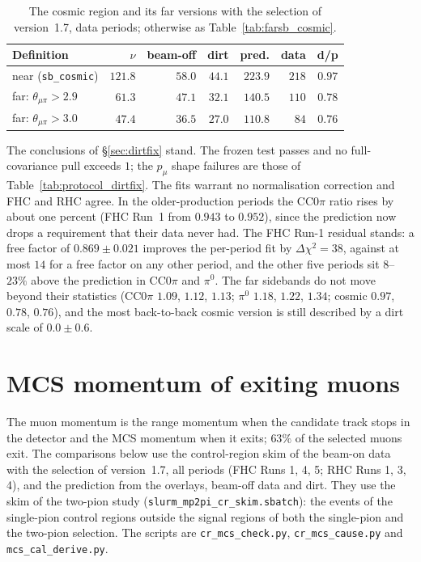 \documentclass[11pt,a4paper]{article}
\begin{document}
\begin{table}[H]
  \centering
  \caption{The cosmic region and its far versions with the selection of version~1.7, data periods; otherwise as
    Table~\ref{tab:farsb_cosmic}.}
  \label{tab:farsb_cosmic_braggfix}
  \small
  \begin{tabular}{lrrrrrc}
    \toprule
    Definition & $\nu$ & beam-off & dirt & pred. & data & d/p \\
    \midrule
    near (\texttt{sb\_cosmic})       & $121.8$ & $58.0$ & $44.1$ & $223.9$ & $218$ & $0.97$ \\
    far: $\theta_{\mu\pi}>2.9$       & $61.3$  & $47.1$ & $32.1$ & $140.5$ & $110$ & $0.78$ \\
    far: $\theta_{\mu\pi}>3.0$       & $47.4$  & $36.5$ & $27.0$ & $110.8$ & $84$  & $0.76$ \\
    \bottomrule
  \end{tabular}
\end{table}

The conclusions of \S\ref{sec:dirtfix} stand. The frozen test passes and no full-covariance pull exceeds $1$; the
$p_\mu$ shape failures are those of Table~\ref{tab:protocol_dirtfix}. The fits warrant no normalisation correction and
FHC and RHC agree. In the older-production periods the CC$0\pi$ ratio rises by about one percent (FHC Run~1 from
$0.943$ to $0.952$), since the prediction now drops a requirement that their data never had. The FHC Run-1 residual
stands: a free factor of $0.869\pm0.021$ improves the per-period fit by $\Delta\chi^2=38$, against at most $14$ for a
free factor on any other period, and the other five periods sit $8$--$23\%$ above the prediction in CC$0\pi$ and
$\pi^0$. The far sidebands do not move beyond their statistics (CC$0\pi$ $1.09$, $1.12$, $1.13$; $\pi^0$ $1.18$,
$1.22$, $1.34$; cosmic $0.97$, $0.78$, $0.76$), and the most back-to-back cosmic version is still described by a dirt
scale of $0.0\pm0.6$.

\section{MCS momentum of exiting muons}
\label{sec:mcs_cr}

The muon momentum is the range momentum when the candidate track stops in the detector and the MCS momentum when it
exits; $63\%$ of the selected muons exit. The comparisons below use the control-region skim of the beam-on data with
the selection of version~1.7, all periods (FHC Runs 1, 4, 5; RHC Runs 1, 3, 4), and the prediction from the overlays,
beam-off data and dirt. They use the skim of the two-pion study (\texttt{slurm\_mp2pi\_cr\_skim.sbatch}): the events of
the single-pion control regions outside the signal regions of both the single-pion and the two-pion selection. The
scripts are \texttt{cr\_mcs\_check.py}, \texttt{cr\_mcs\_cause.py} and \texttt{mcs\_cal\_derive.py}.
\end{document}
